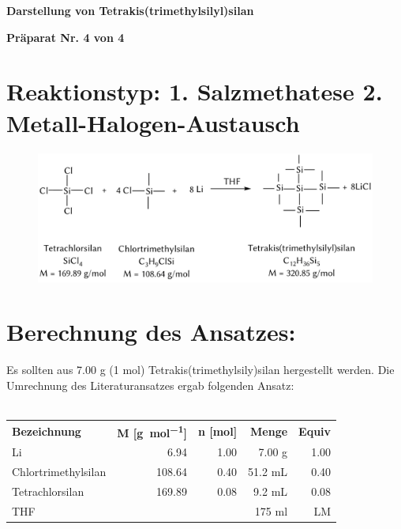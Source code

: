 \documentclass[12pt]{article}
\begin{document}
\begin{onehalfspace}
  {\hfil  \textbf{\large Darstellung von Tetrakis(trimethylsilyl)silan}\hfil}
\par
  \vspace{1cm}
\hfil \textbf{Präparat Nr. 4 von 4 }\hfil
\section{Reaktionstyp: \textnormal{1. Salzmethatese 2. Metall-Halogen-Austausch}  }
\begin{figure}[!ht]
   \centering
\includegraphics[width=\textwidth]{reaktion.png}
\end{figure}


\section{Berechnung des Ansatzes: }
Es sollten aus 7.00 g (1 \si{\mol})  Tetrakis(trimethylsily)silan hergestellt werden.
Die Umrechnung des Literaturansatzes\cite{silicongilman} ergab folgenden Ansatz:\\\\
\noindent
\begin{tabular}{lrrrr}
\toprule
\textbf{ Bezeichnung }&\textbf{M [\si{\gram\per\mol}]} & \textbf{ n [\si{\mol}]} & \textbf{Menge} &  \textbf{Equiv}\\
Li             & 6.94    & 1.00 & 7.00 \si{\gram}          & 1.00 \\
Chlortrimethylsilan  & 108.64  & 0.40  & 51.2 \si{\milli\liter} & 0.40  \\
Tetrachlorsilan       & 169.89  &  0.08  & 9.2 \si{\milli\liter}  & 0.08 \\
THF            &         &      &         175 ml         &  LM  \\
\end{tabular}


\end{onehalfspace}
\end{document}
